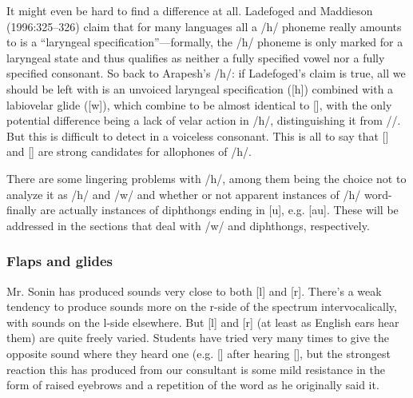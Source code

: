 \documentclass[pdftex,12pt,letterpaper]{article}
\let\ipa\textipa
\def\sw{\ipa{\super w}}
\begin{document}
It might even be hard to find a difference at all. Ladefoged and Maddieson (1996:325--326) claim that for many languages all a /h/ phoneme really amounts to is a ``laryngeal specification''---formally, the /h/ phoneme is only marked for a laryngeal state and thus qualifies as neither a fully specified vowel nor a fully specified consonant. So back to Arapesh's /h\sw/: if Ladefoged's claim is true, all we should be left with is an unvoiced laryngeal specification ([h]) combined with a labiovelar glide ([w]), which combine to be almost identical to [\ipa{\r*w}], with the only potential difference being a lack of velar action in /h\sw/, distinguishing it from /\ipa{F}/. But this is difficult to detect in a voiceless consonant. This is all to say that [\ipa{F}] and [\ipa{\r*w}] are strong candidates for allophones of /h\sw/.   %
 
 There are some lingering problems with /h\sw/, among them being the choice not to analyze it as /h/ and /w/ and whether or not apparent instances of /h\sw/ word-finally are actually instances of diphthongs ending in [u], e.g. [au]. These will be addressed in the sections that deal with /w/ and diphthongs, respectively. 

 \subsubsection{Flaps and glides}

 Mr. Sonin has produced sounds very close to both {[l]} and {[r]}. There's a weak tendency to produce sounds more on the r-side of the spectrum intervocalically, with sounds on the l-side elsewhere. But {[l]} and {[r]} (at least as English ears hear them) are quite freely varied. Students have tried very many times to give the opposite sound where they heard one (e.g. {[\ipa{@lmatok\sw}]} after hearing {[\ipa{@rmatok\sw}]}, but the strongest reaction this has produced from our consultant is some mild resistance in the form of raised eyebrows and a repetition of the word as he originally said it.
\end{document}
